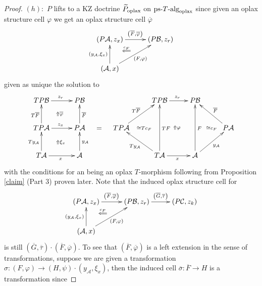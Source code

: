 \documentclass[a4paper,oneside,english]{amsart}
\numberwithin{equation}{section}
\numberwithin{figure}{section}
\theoremstyle{plain}
\theoremstyle{definition}
\theoremstyle{remark}
\theoremstyle{definition}
\theoremstyle{plain}
\theoremstyle{plain}
\theoremstyle{plain}
\begin{document}
\begin{proof}
$\left(h\right)\colon$ $P$ lifts to a KZ doctrine $\widetilde{P}_{\textnormal{oplax}}$
on $\text{ps-}T\text{-alg}_{\textnormal{oplax}}$ since given an oplax
structure cell $\varphi$ we get an oplax structure cell $\overline{\varphi}$
\[
\xymatrix@=1em{\left(P\mathcal{A},z_{x}\right)\ar[rr]^{\left(\overline{F},\overline{\varphi}\right)}\ar@{}[dr]|-{\stackrel{c_{F}}{\Longleftarrow}} &  & \left(P\mathcal{B},z_{r}\right)\\
 & \;\\
\left(\mathcal{A},x\right)\ar[uurr]_{\left(F,\varphi\right)}\ar[uu]^{\left(y_{\mathcal{A}},\xi_{x}\right)}
}
\]
given as unique the solution to 
\[
\xymatrix@=1em{TP\mathcal{B}\ar[rr]^{z_{r}}\ar@{}[ddrr]|-{\Uparrow\overline{\varphi}} &  & P\mathcal{B} &  &  &  & TP\mathcal{B}\ar[rr]^{z_{r}}\ar@{}[rrdddd]|-{\Uparrow\varphi} &  & P\mathcal{B}\\
\\
TP\mathcal{A}\ar[rr]^{z_{x}}\ar@{}[ddrr]|-{\Uparrow\xi_{x}}\ar[uu]^{T\overline{F}} &  & P\mathcal{A}\ar[uu]_{\overline{F}} & = & TP\mathcal{A}\ar[uurr]^{T\overline{F}} & \ar@{}[]|-{\quad\cong Tc_{F}} &  &  &  & \ar@{}[]|-{\cong c_{F}} & P\mathcal{A}\ar[lluu]_{\overline{F}}\\
 & \;\\
T\mathcal{A}\ar[uu]^{Ty_{\mathcal{A}}}\ar[rr]_{x} &  & \mathcal{A}\ar[uu]_{y_{\mathcal{A}}} &  &  &  & T\mathcal{A}\ar[uull]^{Ty_{\mathcal{A}}}\ar[rr]_{x}\ar[uuuu]_{TF} &  & \mathcal{A}\ar[urru]_{y_{\mathcal{A}}}\ar[uuuu]_{F}
}
\]
with the conditions for an being an oplax $T$-morphism following
from Proposition \ref{claim} (Part 3) proven later. Note that the
induced oplax structure cell for 
\[
\xymatrix@=1em{\left(P\mathcal{A},z_{x}\right)\ar[rr]^{\left(\overline{F},\overline{\varphi}\right)}\ar@{}[dr]|-{\stackrel{c_{F}}{\Longleftarrow}} &  & \left(P\mathcal{B},z_{r}\right)\ar[rr]^{\left(\overline{G},\overline{\tau}\right)} &  & \left(P\mathcal{C},z_{k}\right)\\
 & \;\\
\left(\mathcal{A},x\right)\ar[uurr]_{\left(F,\varphi\right)}\ar[uu]^{\left(y_{\mathcal{A}},\xi_{x}\right)}
}
\]
is still $\left(\overline{G},\overline{\tau}\right)\cdot\left(\overline{F},\overline{\varphi}\right)$.
To see that $\left(\overline{F},\overline{\varphi}\right)$ is a left
extension in the sense of transformations, suppose we are given a
transformation $\sigma\colon\left(F,\varphi\right)\to\left(H,\psi\right)\cdot\left(y_{\mathcal{A}},\xi_{x}\right)$,
then the induced cell $\overline{\sigma}\colon\overline{F}\to H$
is a transformation since


\end{proof}
\end{document}

